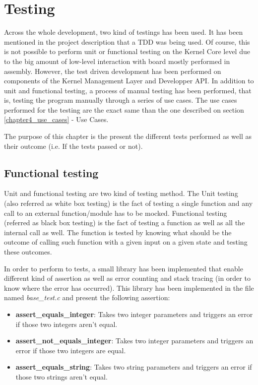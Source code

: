 \chapter{Testing}

Across the whole development, two kind of testings has been used. It has been mentioned in the project description that a TDD was being used. Of course, this is not possible to perform unit or functional testing on the Kernel Core level due to the big amount of low-level interaction with board mostly performed in assembly. However, the test driven development has been performed on components of the Kernel Management Layer and Developper API. In addition to unit and functional testing, a process of manual testing has been performed, that is, testing the program manually through a series of use cases. The use cases performed for the testing are the exact same than the one described on section \ref{chapter4_use_cases} - Use Cases.

The purpose of this chapter is the present the different tests performed as well as their outcome (i.e. If the tests passed or not).


\section{Functional testing}

Unit and functional testing are two kind of testing method. The Unit testing (also referred as white box testing) is the fact of testing a single function and any call to an external function/module has to be mocked. Functional testing (referred as black box testing) is the fact of testing a function as well as all the internal call as well. The function is tested by knowing what should be the outcome of calling such function with a given input on a given state and testing these outcomes.

In order to perform to tests, a small library has been implemented that enable different kind of assertion as well as error counting and stack tracing (in order to know where the error has occurred). This library has been implemented in the file named \textit{base\_test.c} and present the following assertion:
\begin{itemize}
	\item \textbf{assert\_equals\_integer}: Takes two integer parameters and triggers an error if those two integers aren't equal.
	\item \textbf{assert\_not\_equals\_integer}: Takes two integer parameters and triggers an error if those two integers are equal.
	\item \textbf{assert\_equals\_string}: Takes two string parameters and triggers an error if those two strings aren't equal.
\end{itemize}

